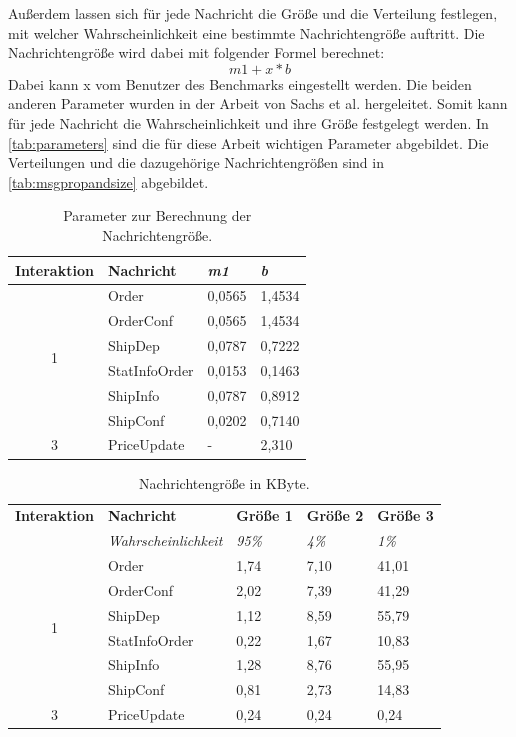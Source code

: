 Außerdem lassen sich für jede Nachricht die Größe und die Verteilung festlegen, mit welcher Wahrscheinlichkeit eine bestimmte Nachrichtengröße auftritt. Die Nachrichtengröße wird dabei mit folgender Formel berechnet: 
\[m1 + x * b\] 
Dabei kann x vom Benutzer des Benchmarks eingestellt werden. Die beiden anderen Parameter wurden in der Arbeit von Sachs et al.\cite{Sachs2013} hergeleitet. Somit kann für jede Nachricht die Wahrscheinlichkeit und ihre Größe festgelegt werden. In \autoref{tab:parameters} sind die für diese Arbeit wichtigen Parameter abgebildet. Die Verteilungen und die dazugehörige Nachrichtengrößen sind in \autoref{tab:msgpropandsize} abgebildet.


\begin{table}
\center
  \begin{tabular}{|c|l|l|l|}
  \hline
    \textbf{Interaktion} & \textbf{Nachricht} & \textit{m1} & \textit{b}  \\
    \hline \hline
    \multirow{6}{*}{1} & Order & 0,0565 & 1,4534 \\\cline{2-4}
    & OrderConf & 0,0565 & 1,4534 \\\cline{2-4}
    & ShipDep & 0,0787 & 0,7222 \\\cline{2-4}
    & StatInfoOrder & 0,0153 & 0,1463 \\\cline{2-4}
    & ShipInfo & 0,0787 & 0,8912 \\\cline{2-4}
    & ShipConf & 0,0202 & 0,7140  \\\hline
    \hline
     3 & PriceUpdate & - & 2,310 \\\hline
  \end{tabular}
	\caption{\label{tab:parameters} Parameter zur Berechnung der Nachrichtengröße.}
\end{table}

\begin{table}
\center
  \begin{tabular}{|c|l|l|l|l|}
  \hline
    \textbf{Interaktion} & \textbf{Nachricht} & \textbf{Größe 1} & \textbf{Größe 2} &\textbf{Größe 3} \\
     & \textit{Wahrscheinlichkeit} & \textit{95\%}  & \textit{4\%} &\textit{1\%}   \\
    \hline \hline
    \multirow{6}{*}{1} & Order & 1,74 & 7,10 & 41,01 \\\cline{2-5}
    & OrderConf & 2,02 & 7,39 & 41,29 \\\cline{2-5}
    & ShipDep & 1,12 & 8,59 & 55,79\\\cline{2-5}
    & StatInfoOrder & 0,22 & 1,67 & 10,83 \\\cline{2-5}
    & ShipInfo & 1,28 & 8,76 & 55,95 \\\cline{2-5}
    & ShipConf & 0,81 & 2,73 & 14,83  \\\hline
    \hline
     3 & PriceUpdate & 0,24 & 0,24 & 0,24 \\\hline
  \end{tabular}
	\caption{\label{tab:msgpropandsize} Nachrichtengröße in KByte.}
\end{table}

